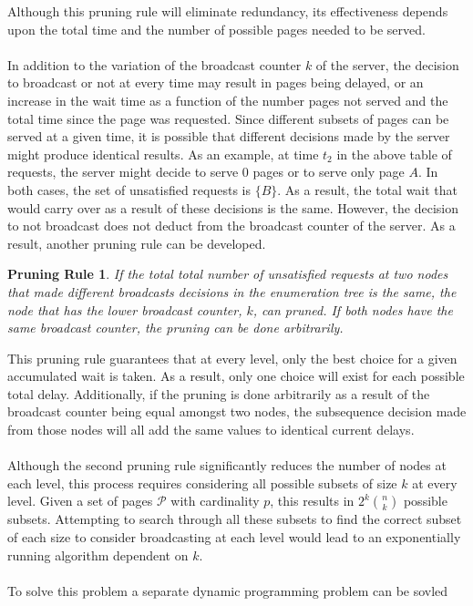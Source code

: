 \documentclass[12pt]{article}
\newtheorem*{prune}{Pruning Rule}
\begin{document}
Although this pruning rule will eliminate redundancy, its effectiveness depends 
upon the total time and the number of possible pages needed to be served.\\\\
In addition to the variation of the broadcast counter $k$ of the server,
the decision to broadcast or not at every time may result in pages being delayed,
or an increase in the wait time as a function of the number pages not served
and the total time since the page was requested.  Since different subsets of 
pages can be served at a given time, it is possible that different decisions
made by the server might produce identical results.  As an example, at time 
$t_2$ in the above table of requests, the server might decide to serve $0$ pages
or to serve only page $A$.  In both cases, the set of unsatisfied requests is $\{B\}$.
As a result, the total wait that would carry over as a result of these decisions
is the same.
However, the decision to not broadcast does not deduct from the broadcast counter
of the server.  As a result, another pruning rule can be developed. 
\begin{prune}
If the total total number of unsatisfied requests at two nodes that made
different broadcasts decisions in the enumeration tree is the same, the
node that has the lower broadcast counter, $k$, can pruned.  If both nodes
have the same broadcast counter, the pruning can be done arbitrarily.
\end{prune}
This pruning rule guarantees that at every level, only the best choice
for a given accumulated wait is taken.  As a result, only one choice
will exist for each possible total delay.  Additionally, if the pruning
is done arbitrarily as a result of the broadcast counter being equal
amongst two nodes, the subsequence decision made from those nodes will
all add the same values to identical current delays.\\\\
Although the second pruning rule significantly reduces the number of nodes
at each level, this process requires considering all possible subsets of
size $k$ at every level.  Given a set of pages $\mathcal{P}$ with cardinality
$p$, this results in $2^{k}\binom nk$ possible subsets.  Attempting to 
search through all these subsets to find the correct subset of each size to consider
broadcasting at each level would lead to an exponentially running algorithm
dependent on $k$.\\\\
To solve this problem a separate dynamic programming problem can be sovled
\end{document}
